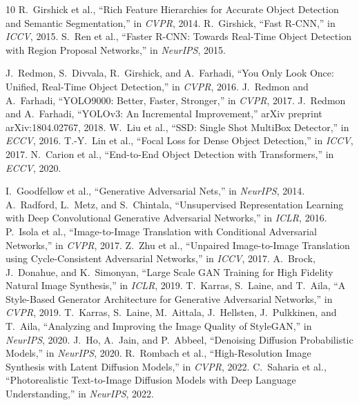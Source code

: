 \documentclass{article}
\begin{document}
\begin{thebibliography}{10}
 R.~Girshick et al., ``Rich Feature Hierarchies for Accurate Object Detection and Semantic Segmentation,'' in \textit{CVPR}, 2014.
 R.~Girshick, ``Fast R-CNN,'' in \textit{ICCV}, 2015.
 S.~Ren et al., ``Faster R-CNN: Towards Real-Time Object Detection with Region Proposal Networks,'' in \textit{NeurIPS}, 2015.

 J.~Redmon, S.~Divvala, R.~Girshick, and A.~Farhadi, ``You Only Look Once: Unified, Real-Time Object Detection,'' in \textit{CVPR}, 2016.
 J.~Redmon and A.~Farhadi, ``YOLO9000: Better, Faster, Stronger,'' in \textit{CVPR}, 2017.
 J.~Redmon and A.~Farhadi, ``YOLOv3: An Incremental Improvement,'' arXiv preprint arXiv:1804.02767, 2018.
 W.~Liu et al., ``SSD: Single Shot MultiBox Detector,'' in \textit{ECCV}, 2016.
 T.-Y.~Lin et al., ``Focal Loss for Dense Object Detection,'' in \textit{ICCV}, 2017.
 N.~Carion et al., ``End-to-End Object Detection with Transformers,'' in \textit{ECCV}, 2020.

 I.~Goodfellow et al., ``Generative Adversarial Nets,'' in \textit{NeurIPS}, 2014.
 A.~Radford, L.~Metz, and S.~Chintala, ``Unsupervised Representation Learning with Deep Convolutional Generative Adversarial Networks,'' in \textit{ICLR}, 2016.
 P.~Isola et al., ``Image-to-Image Translation with Conditional Adversarial Networks,'' in \textit{CVPR}, 2017.
 Z.~Zhu et al., ``Unpaired Image-to-Image Translation using Cycle-Consistent Adversarial Networks,'' in \textit{ICCV}, 2017.
 A.~Brock, J.~Donahue, and K.~Simonyan, ``Large Scale GAN Training for High Fidelity Natural Image Synthesis,'' in \textit{ICLR}, 2019.
 T.~Karras, S.~Laine, and T.~Aila, ``A Style-Based Generator Architecture for Generative Adversarial Networks,'' in \textit{CVPR}, 2019.
 T.~Karras, S.~Laine, M.~Aittala, J.~Hellsten, J.~Pulkkinen, and T.~Aila, ``Analyzing and Improving the Image Quality of StyleGAN,'' in \textit{NeurIPS}, 2020.
 J.~Ho, A.~Jain, and P.~Abbeel, ``Denoising Diffusion Probabilistic Models,'' in \textit{NeurIPS}, 2020.
 R.~Rombach et al., ``High-Resolution Image Synthesis with Latent Diffusion Models,'' in \textit{CVPR}, 2022.
 C.~Saharia et al., ``Photorealistic Text-to-Image Diffusion Models with Deep Language Understanding,'' in \textit{NeurIPS}, 2022.


\end{thebibliography}
\end{document}
